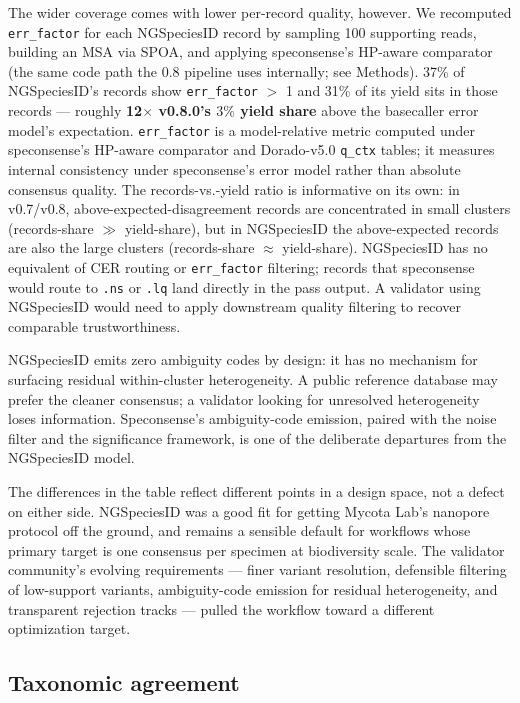 \documentclass[11pt]{article}
\begin{document}
The wider coverage comes with lower per-record quality, however. We
recomputed \texttt{err\_factor} for each NGSpeciesID record by
sampling 100 supporting reads, building an MSA via SPOA, and applying
speconsense's HP-aware comparator (the same code path the 0.8 pipeline
uses internally; see Methods). 37\% of NGSpeciesID's records show
\texttt{err\_factor} $>$ 1 and 31\% of its yield sits in those records
--- roughly \textbf{12$\times$ v0.8.0's $3\%$ yield share} above the
basecaller error model's expectation. \texttt{err\_factor} is a
model-relative metric computed under speconsense's HP-aware
comparator and Dorado-v5.0 \texttt{q\_ctx} tables; it measures
internal consistency under speconsense's error model rather than
absolute consensus quality. The records-vs.-yield ratio is
informative on its own: in v0.7/v0.8, above-expected-disagreement
records are concentrated in small clusters (records-share $\gg$
yield-share), but in NGSpeciesID the above-expected records are also
the large clusters (records-share $\approx$ yield-share). NGSpeciesID
has no equivalent of CER routing or \texttt{err\_factor} filtering;
records that speconsense would route to \texttt{.ns} or \texttt{.lq}
land directly in the pass output. A validator using NGSpeciesID would
need to apply downstream quality filtering to recover comparable
trustworthiness.

NGSpeciesID emits zero ambiguity codes by design: it has no mechanism
for surfacing residual within-cluster heterogeneity. A public reference
database may prefer the cleaner consensus; a validator looking for
unresolved heterogeneity loses information. Speconsense's
ambiguity-code emission, paired with the noise filter and the
significance framework, is one of the deliberate departures from the
NGSpeciesID model.

The differences in the table reflect different points in a design
space, not a defect on either side. NGSpeciesID was a good fit for
getting Mycota Lab's nanopore protocol off the ground, and remains a
sensible default for workflows whose primary target is one consensus
per specimen at biodiversity scale. The validator community's evolving
requirements --- finer variant resolution, defensible filtering of
low-support variants, ambiguity-code emission for residual
heterogeneity, and transparent rejection tracks --- pulled the workflow
toward a different optimization target.

\subsection{Taxonomic agreement}
\label{sec:results-tax}
\end{document}
